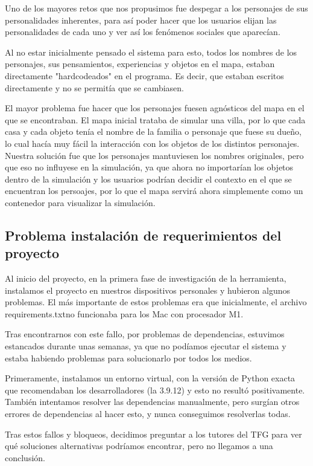 Uno de los mayores retos que nos propusimos fue despegar a los personajes de sus personalidades inherentes, para así poder hacer que los usuarios elijan las personalidades de cada uno y ver así los fenómenos sociales que aparecían.

Al no estar inicialmente pensado el sistema para esto, todos los nombres de los personajes, sus pensamientos, experiencias y objetos en el mapa, estaban directamente "hardcodeados" en el programa. Es decir, que estaban escritos directamente y no se permitía que se cambiasen.

El mayor problema fue hacer que los personajes fuesen agnósticos del mapa en el que se encontraban. El mapa inicial trataba de simular una villa, por lo que cada casa y cada objeto tenía el nombre de la familia o personaje que fuese su dueño, lo cual hacía muy fácil la interacción con los objetos de los distintos personajes. Nuestra solución fue que los personajes mantuviesen los nombres originales, pero que eso no influyese en la simulación, ya que ahora no importarían los objetos dentro de la simulación y los usuarios podrían decidir el contexto en el que se encuentran los persoajes, por lo que el mapa servirá ahora simplemente como un contenedor para visualizar la simulación.

\subsection{Problema instalación de requerimientos del proyecto}

Al inicio del proyecto, en la primera fase de investigación de la herramienta, instalamos el proyecto en nuestros dispositivos personales y hubieron algunos problemas. El más importante de estos problemas era que inicialmente, el archivo \textquotesingle requirements.txt\textquotesingle no funcionaba para los Mac con procesador M1.

Tras encontrarnos con este fallo, por problemas de dependencias, estuvimos estancados durante unas semanas, ya que no podíamos ejecutar el sistema y estaba habiendo problemas para solucionarlo por todos los medios.

Primeramente, instalamos un entorno virtual, con la versión de Python exacta que recomendaban los desarrolladores (la 3.9.12) y esto no resultó positivamente. También intentamos resolver las dependencias manualmente, pero surgían otros errores de dependencias al hacer esto, y nunca conseguimos resolverlas todas.

Tras estos fallos y bloqueos, decidimos preguntar a los tutores del TFG para ver qué soluciones alternativas podríamos encontrar, pero no llegamos a una conclusión. 

